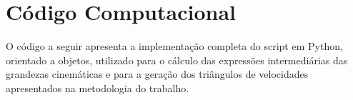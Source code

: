 \appendix
\section{Código Computacional}
\label{anexo:codigo_python}

O código a seguir apresenta a implementação completa do script em Python, orientado a objetos, utilizado para o cálculo das expressões intermediárias das grandezas cinemáticas e para a geração dos triângulos de velocidades apresentados na metodologia do trabalho.


